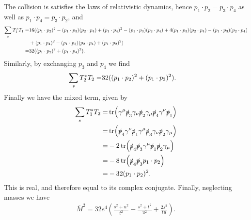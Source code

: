 The collision is satisfies the laws of relativistic dynamics, hence $p_{1}\cdot p_{2} = p_{3}\cdot p_{4}$ as well as $p_{1}\cdot p_{4} = p_{3}\cdot p_{2}$, and
\begin{align*}
	\sum\limits_{s}T_{1}^{\star} T_{1} =& 16((p_{1}\cdot p_{2})^{2} - (p_{1}\cdot p_{3})(p_{2}\cdot p_{4}) + (p_{1}\cdot p_{4})^{2} - (p_{1}\cdot p_{3})(p_{2}\cdot p_{4}) + 4(p_{1}\cdot p_{3})(p_{2}\cdot p_{4}) - (p_{1}\cdot p_{3})(p_{2}\cdot p_{4}) \\
	                               &+ (p_{1}\cdot p_{4})^{2} - (p_{1}\cdot p_{3})(p_{2}\cdot p_{4}) + (p_{1}\cdot p_{2})^{2}) \\
	                              =& 32((p_{1}\cdot p_{2})^{2} + (p_{1}\cdot p_{4})^{2}).
\end{align*}
Similarly, by exchanging $p_{3}$ and $p_{4}$ we find
\begin{align*}
	\sum\limits_{s}T_{2}^{\star} T_{2} =& 32((p_{1}\cdot p_{2})^{2} + (p_{1}\cdot p_{3})^{2}).
\end{align*}
Finally we have the mixed term, given by
\begin{align*}
	\sum\limits_{s}T_{1}^{\star} T_{2} =& \tr(\gamma^{\mu}\slashed{p}_{3}\gamma_{\nu}\slashed{p}_{2}\gamma_{\mu}\slashed{p}_{4}\gamma^{\nu}\slashed{p}_{1}) \\
	=& \tr(\slashed{p}_{4}\gamma^{\nu}\slashed{p}_{1}\gamma^{\mu}\slashed{p}_{3}\gamma_{\nu}\slashed{p}_{2}\gamma_{\mu}) \\
	=& -2\tr(\slashed{p}_{4}\slashed{p}_{3}\gamma^{\mu}\slashed{p}_{1}\slashed{p}_{2}\gamma_{\mu}) \\
	=& -8\tr(\slashed{p}_{4}\slashed{p}_{3}p_{1}\cdot p_{2}) \\
	=& -32(p_{1}\cdot p_{2})^{2}.
\end{align*}
This is real, and therefore equal to its complex conjugate. Finally, neglecting masses we have
\begin{align*}
	\overline{M}^{2} = 32e^{4}\left(\frac{s^{2} + u^{2}}{t^{2}} + \frac{s^{2} + t^{2}}{u^{2}} + \frac{2s^{2}}{tu}\right).
\end{align*}

